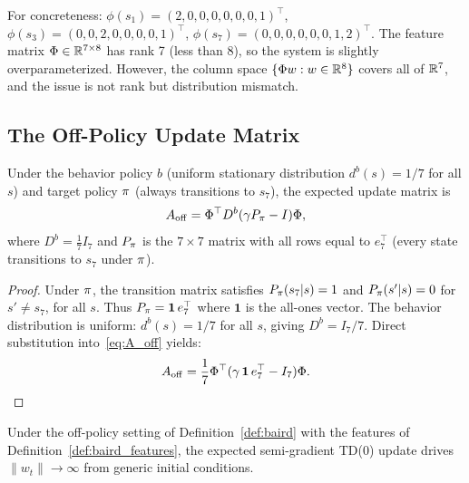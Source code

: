\documentclass[11pt,a4paper]{article}
\begin{document}
\begin{example}
\label{ex:features}
For concreteness:
$\phi(s_1) = (2,0,0,0,0,0,0,1)^\top$,
$\phi(s_3) = (0,0,2,0,0,0,0,1)^\top$,
$\phi(s_7) = (0,0,0,0,0,0,1,2)^\top$.
The feature matrix $\Phi \in \mathbb{R}^{7 \times 8}$ has rank 7 (less
than 8), so the system is slightly overparameterized. However, the
column space $\{\Phi w : w \in \mathbb{R}^8\}$ covers all of $\mathbb{R}^7$, and
the issue is not rank but distribution mismatch.
\end{example}

\subsection{The Off-Policy Update Matrix}
\label{subsec:off_policy_matrix}

\begin{lemma}
\label{lem:A_off}
Under the behavior policy $b$ (uniform stationary distribution
$d^b(s) = 1/7$ for all $s$) and target policy $\pi$ (always
transitions to $s_7$), the expected update matrix is
\begin{equation}
  A_{\mathrm{off}} = \Phi^\top D^b(\gamma P_\pi - I)\Phi,
  \label{eq:A_off}
\end{equation}
where $D^b = \frac{1}{7}I_7$ and $P_\pi$ is the $7 \times 7$
matrix with all rows equal to $e_7^\top$ (every state transitions
to $s_7$ under $\pi$).
\end{lemma}

\begin{proof}
Under $\pi$, the transition matrix satisfies
$P_\pi(s_7|s) = 1$ and $P_\pi(s'|s) = 0$ for $s' \neq s_7$,
for all $s$. Thus $P_\pi = \mathbf{1}\, e_7^\top$ where
$\mathbf{1}$ is the all-ones vector. The behavior distribution is
uniform: $d^b(s) = 1/7$ for all $s$, giving $D^b = I_7/7$.
Direct substitution into~\eqref{eq:A_off} yields:
\begin{equation}
  A_{\mathrm{off}}
  = \frac{1}{7}\Phi^\top(\gamma\,\mathbf{1}\,e_7^\top - I_7)\Phi.
  \qedhere
\end{equation}
\end{proof}

\begin{theorem}
\label{thm:divergence}
Under the off-policy setting of Definition~\ref{def:baird} with the
features of Definition~\ref{def:baird_features}, the expected
semi-gradient TD(0) update drives $\|w_t\| \to \infty$ from generic
initial conditions.
\end{theorem}
\end{document}
